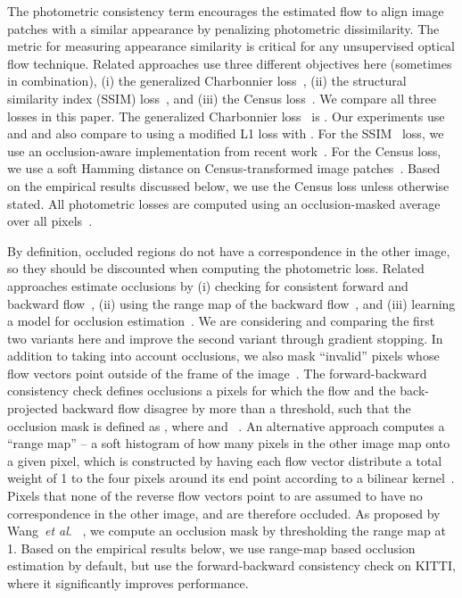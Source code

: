 \documentclass[runningheads]{llncs}
\newcommand{\etal}{\textit{et al}. }
\begin{document}
 The photometric consistency term encourages the estimated flow to align image patches with a similar appearance by penalizing photometric dissimilarity. The metric for measuring appearance similarity is critical for any unsupervised optical flow technique. Related approaches use three different objectives here (sometimes in combination), (i) the generalized Charbonnier loss~\cite{Janai2018ECCV,meister2018unflow,ren2017unsupervised,wang2018occlusion,jjyu2016unsupflow,Zhong2019UnsupervisedDE}, (ii) the structural similarity index (SSIM) loss~\cite{yin2018geonet,ranjan2019cvpr,wang2018unos}, and (iii) the Census loss~\cite{meister2018unflow,Zhong2019UnsupervisedDE,zou2018dfnet}. We compare all three losses in this paper.
The generalized Charbonnier loss~\cite{Sun2010} is . Our experiments use  and  and also compare to using a modified L1 loss  with .
For the SSIM~\cite{Wang04imagequality} loss, we use an occlusion-aware implementation from recent work~\cite{Gordon2019}. For the Census loss, we use a soft Hamming distance on Census-transformed image patches~\cite{meister2018unflow}. Based on the empirical results discussed below, we use the Census loss unless otherwise stated. All photometric losses are computed using an occlusion-masked average over all pixels~\cite{wang2018occlusion}. 

 By definition, occluded regions do not have a correspondence in the other image, so they should be discounted when computing the photometric loss.
Related approaches estimate occlusions by (i) checking for consistent forward and backward flow~\cite{wang2018occlusion}, (ii) using the range map of the backward flow~\cite{Brox04}, and (iii) learning a model for occlusion estimation~\cite{Janai2018ECCV}. We are considering and comparing the first two variants here and improve the second variant through gradient stopping. In addition to taking into account occlusions, we also mask ``invalid'' pixels whose flow vectors point outside of the frame of the image~\cite{wang2018occlusion}.
The forward-backward consistency check defines occlusions a pixels for which the flow and the back-projected backward flow disagree by more than a threshold, such that the occlusion mask is defined as , where  and ~\cite{sundaram2010dense}. An alternative approach computes a ``range map''  -- a soft histogram of how many pixels in the other image map onto a given pixel, which is constructed by having each flow vector distribute a total weight of 1 to the four pixels around its end point according to a bilinear kernel~\cite{wang2018occlusion}. Pixels that none of the reverse flow vectors point to are assumed to have no correspondence in the other image, and are therefore occluded. As proposed by Wang~\etal~\cite{wang2018occlusion}, we compute an occlusion mask  by thresholding the range map at 1. Based on the empirical results below, we use range-map based occlusion estimation by default, but use the forward-backward consistency check on KITTI, where it significantly improves performance.
\end{document}

